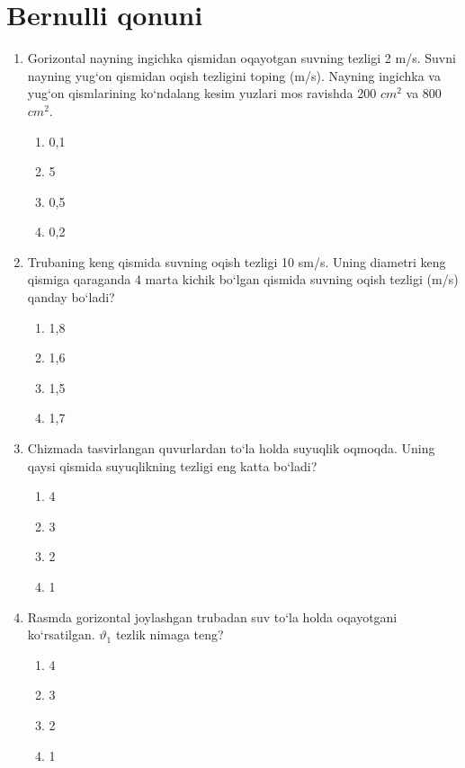 \section{Bernulli qonuni}

\begin{enumerate}

\item Gorizontal nayning ingichka qismidan oqayotgan suvning tezligi 2 m/s. Suvni nayning yug‘on qismidan oqish tezligini toping (m/s). Nayning ingichka va yug‘on qismlarining ko‘ndalang kesim yuzlari mos ravishda 200 $cm^2$ va 800 $cm^2$.
\begin{enumerate}[label=\Alph*)]
\item 0,1
\item 5
\item 0,5
\item 0,2
\end{enumerate}

\item Trubaning keng qismida suvning oqish tezligi 10 sm/s. Uning diametri keng qismiga qaraganda 4 marta kichik bo‘lgan qismida suvning oqish tezligi (m/s) qanday bo‘ladi?
\begin{enumerate}[label=\Alph*)]
\item 1,8
\item 1,6
\item 1,5
\item 1,7
\end{enumerate}

\item Chizmada tasvirlangan quvurlardan to‘la holda suyuqlik oqmoqda. Uning qaysi qismida suyuqlikning tezligi eng katta bo‘ladi?
\begin{enumerate}[label=\Alph*)]
\item 4
\item 3
\item 2
\item 1
\end{enumerate}

\item Rasmda gorizontal joylashgan trubadan suv to‘la holda oqayotgani ko‘rsatilgan. $\vartheta_1$ tezlik nimaga teng?
\begin{enumerate}[label=\Alph*)]
\item 4
\item 3
\item 2
\item 1
\end{enumerate}


\end{enumerate}
